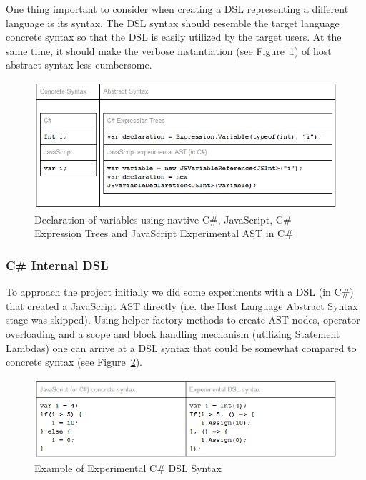 			One thing important to consider when creating a DSL representing a different language is its syntax. The DSL syntax should resemble the target language concrete syntax so that the DSL is easily utilized by the target users. At the same time, it should make the verbose instantiation (see Figure~\ref{approachComparison}) of host abstract syntax less cumbersome.

			\begin{figure}
				\begin{center}
					\centerline{\includegraphics[width=14cm]{resources/images/approachComparison.png}}
				\end{center}
				\caption{Declaration of variables using navtive C\#, JavaScript, C\# Expression Trees and JavaScript Experimental AST in C\#}
				\label{approachComparison}
			\end{figure}

		\subsubsection{C\# Internal DSL}
			To approach the project initially we did some experiments with a DSL (in C\#) that created a JavaScript AST directly (i.e. the Host Language Abstract Syntax stage was skipped). Using helper factory methods to create AST nodes, operator overloading and a scope and block handling mechanism (utilizing Statement Lambdas) one can arrive at a DSL syntax that could be somewhat compared to concrete syntax (see Figure~\ref{kiwiExample}).

			\begin{figure}
				\begin{center}
					\centerline{\includegraphics[width=14cm]{resources/images/kiwiExample.png}}
				\end{center}
				\caption{Example of Experimental C\# DSL Syntax}
				\label{kiwiExample}
			\end{figure}

